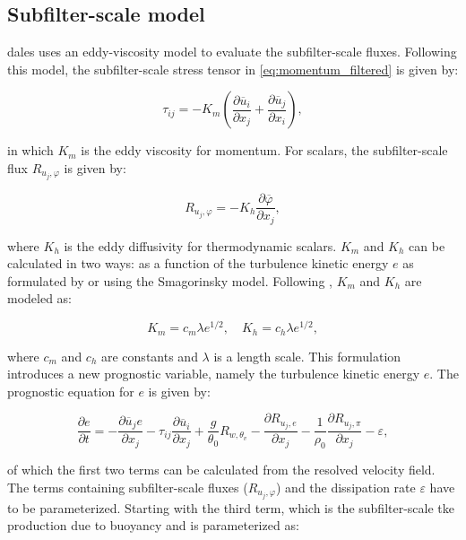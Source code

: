 \subsection{Subfilter-scale model}
\acrshort{dales} uses an eddy-viscosity model to evaluate the subfilter-scale fluxes. Following this model, the subfilter-scale stress tensor in \autoref{eq:momentum_filtered} is given by:

\begin{equation}
    \tau_{ij} = - K_m \left( \frac{\partial \overline{u}_i}{\partial x_j} + \frac{\partial \overline{u}_j}{\partial x_i} \right),
\end{equation}

in which $K_m$ is the eddy viscosity for momentum. For scalars, the subfilter-scale flux $R_{u_j,\varphi}$ is given by:

\begin{equation}
    R_{u_j,\varphi} = - K_h \frac{\partial \overline{\varphi}}{\partial x_j},
\end{equation}

where $K_h$ is the eddy diffusivity for thermodynamic scalars. $K_m$ and $K_h$ can be calculated in two ways: as a function of the turbulence kinetic energy $e$ as formulated by \citet{deardorffStratocumuluscappedMixedLayers1980} or using the Smagorinsky model. Following \citet{deardorffStratocumuluscappedMixedLayers1980}, $K_m$ and $K_h$ are modeled as:

\begin{equation}
    K_m = c_m \lambda e^{1/2}, \quad K_h = c_h \lambda e^{1/2},
\end{equation}

where $c_m$ and $c_h$ are constants and $\lambda$ is a length scale. This formulation introduces a new prognostic variable, namely the turbulence kinetic energy $e$. The prognostic equation for $e$ is given by:

\begin{equation}
    \frac{\partial e}{\partial t} = - \frac{\partial \overline{u}_j e}{\partial x_j} - \tau_{ij} \frac{\partial \overline{u}_i}{\partial x_j} + \frac{g}{\theta_0} R_{w,\theta_v} - \frac{\partial R_{u_j,e}}{\partial x_j} - \frac{1}{\rho_0} \frac{\partial R_{u_j,\pi}}{\partial x_j} - \varepsilon,
    \label{eq:deardorff_tke}
\end{equation}

of which the first two terms can be calculated from the resolved velocity field. The terms containing subfilter-scale fluxes ($R_{u_j,\varphi}$) and the dissipation rate $\varepsilon$ have to be parameterized. Starting with the third term, which is the subfilter-scale \acrshort{tke} production due to buoyancy and is parameterized as:

